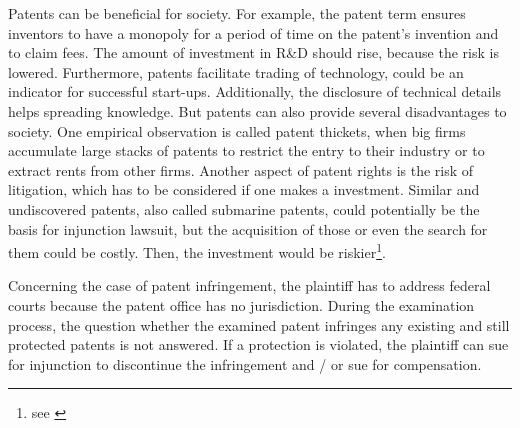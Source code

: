 \documentclass[12pt, a4paper]{scrartcl}
\theoremstyle{definition}
\begin{document}
Patents can be beneficial for society. For example, the patent term ensures
inventors to have a monopoly for a period of time on the patent's invention and
to claim fees. The amount of investment in R\&D should rise, because the risk
is lowered. Furthermore, patents facilitate trading of technology, could be an
indicator for successful start-ups. Additionally, the disclosure of technical
details helps spreading knowledge. But patents can also provide several
disadvantages to society. One empirical observation is called patent thickets,
when big firms accumulate large stacks of patents to restrict the entry to
their industry or to extract rents from other firms. Another aspect of patent
rights is the risk of litigation, which has to be considered if one makes a
investment. Similar and undiscovered patents, also called submarine patents,
could potentially be the basis for injunction lawsuit, but the acquisition of
those or even the search for them could be costly. Then, the investment would
be riskier\footnote{see \citet{bessen2011generation}}.

Concerning the case of patent infringement, the plaintiff has to address
federal courts because the patent office has no jurisdiction. During the
examination process, the question whether the examined patent infringes any
existing and still protected patents is not answered. If a protection is
violated, the plaintiff can sue for injunction to discontinue the infringement
and / or sue for compensation.
\end{document}
